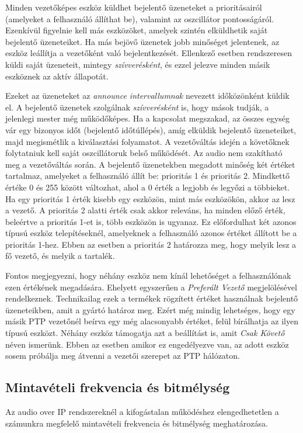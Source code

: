 Minden vezetőképes eszköz küldhet bejelentő üzeneteket a prioritásairól (amelyeket a felhasználó állíthat be),
valamint az oszcillátor pontosságáról. Ezenkívül figyelnie kell más eszközöket,
amelyek szintén elküldhetik saját bejelentő üzeneteiket. 
Ha más bejövő üzenetek jobb minőséget jelentenek, az eszköz leállítja a vezetőként való bejelentkezését.
Ellenkező esetben rendszeresen küldi saját üzeneteit, mintegy \textit{szívverésként},
és ezzel jelezve minden másik eszköznek az aktív állapotát. 

Ezeket az üzeneteket az \textit{announce intervallumnak} nevezett időközönként küldik el. 
A bejelentő üzenetek szolgálnak \textit{szívverésként} is, hogy mások tudják, a jelenlegi mester még működőképes.
Ha a kapcsolat megszakad, az összes egység vár egy bizonyos időt (bejelentő időtúllépés),
amíg elküldik bejelentő üzeneteiket, majd megismétlik a kiválasztási folyamatot. 
A vezetőváltás idején a követőknek folytatniuk kell saját oszcillátoruk belső működését.
Az audio nem szakítható meg a vezetőváltás során.
A bejelentő üzenetekben megadott minőség két értéket tartalmaz, amelyeket a felhasználó állít be: prioritás 1 és prioritás 2.
Mindkettő értéke 0 és 255 között változhat, ahol a 0 érték a legjobb és legyőzi a többieket.
Ha egy prioritás 1 érték kisebb egy eszközön, mint más eszközökön,
akkor az lesz a vezető. A prioritás 2 alatti érték csak akkor releváns, ha
minden előző érték, beleértve a prioritás 1-et is, több eszközön is ugyanaz. 
Ez előfordulhat két azonos típusú eszköz telepítéseknél, amelyeknek a felhasználó
azonos értéket állított be a prioritás 1-hez. Ebben az esetben a prioritás 2
határozza meg, hogy melyik lesz a fő vezető, és melyik a tartalék. 

Fontos megjegyezni, hogy néhány eszköz nem kínál lehetőséget a felhasználónak ezen értékének megadására.
Ehelyett egyszerűen a \textit{Preferált Vezető} megjelölésével rendelkeznek.
Technikailag ezek a termékek rögzített értéket használnak bejelentő üzeneteikben, amit a gyártó határoz meg.
Ezért még mindig lehetséges, hogy egy másik PTP vezetőnél beírva egy még alacsonyabb értéket, felül bírálhatja az ilyen típusú eszközt.
Néhány eszköz támogatja azt a beállítást is, amit \textit{Csak Követő} néven ismerünk. Ebben az esetben amikor ez engedélyezve van,
az adott eszköz sosem próbálja meg átvenni a vezetői szerepet az PTP hálózaton.
\subsection{Mintavételi frekvencia és bitmélység}
Az audio over IP rendszereknél a kifogástalan működéshez elengedhetetlen a számunkra
megfelelő mintavételi frekvencia és bitmélység meghatározása.

